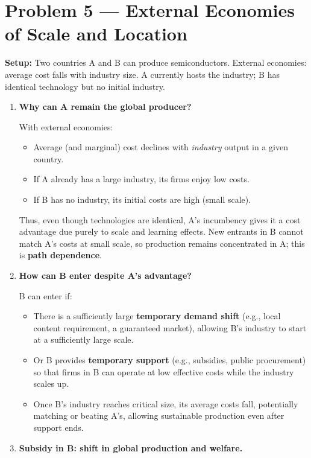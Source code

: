 \documentclass[12pt]{article}
\begin{document}
\section*{Problem 5 — External Economies of Scale and Location}

\textbf{Setup:} Two countries A and B can produce semiconductors.  
External economies: average cost falls with industry size.  
A currently hosts the industry; B has identical technology but no initial industry.

\begin{enumerate}[label=(\arabic*)]

\item \textbf{Why can A remain the global producer?}

With external economies:
\begin{itemize}
\item Average (and marginal) cost declines with \emph{industry} output in a given country.
\item If A already has a large industry, its firms enjoy low costs.
\item If B has no industry, its initial costs are high (small scale).
\end{itemize}
Thus, even though technologies are identical, A's incumbency gives it a cost advantage due purely to scale and learning effects. New entrants in B cannot match A's costs at small scale, so production remains concentrated in A; this is \textbf{path dependence}.

\item \textbf{How can B enter despite A’s advantage?}

B can enter if:
\begin{itemize}
\item There is a sufficiently large \textbf{temporary demand shift} (e.g., local content requirement, a guaranteed market), allowing B's industry to start at a sufficiently large scale.
\item Or B provides \textbf{temporary support} (e.g., subsidies, public procurement) so that firms in B can operate at low effective costs while the industry scales up.
\item Once B's industry reaches critical size, its average costs fall, potentially matching or beating A's, allowing sustainable production even after support ends.
\end{itemize}

\item \textbf{Subsidy in B: shift in global production and welfare.}


\end{enumerate}
\end{document}
